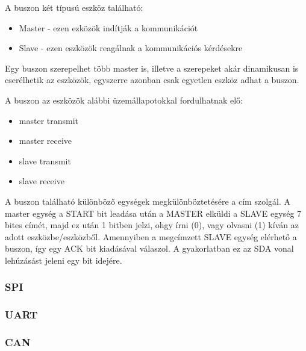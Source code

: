 

A buszon két típusú eszköz található:
\begin{itemize}
    \item Master - ezen ezközök indítják a kommunikációt
    \item Slave - ezen eszközök reagálnak a kommunikációs kérdésekre
\end{itemize}

Egy buszon szerepelhet több master is, illetve a szerepeket akár dinamikusan is cserélhetik az eszközök, egyszerre azonban csak egyetlen eszköz adhat a buszon.

A buszon az eszközök alábbi üzemállapotokkal fordulhatnak elő:
\begin{itemize}
    \item master transmit
    \item master receive
    \item slave transmit
    \item slave receive
\end{itemize}

A buszon található különböző egységek megkülönböztetésére a cím szolgál. A master egység a START bit leadása után a MASTER elküldi a SLAVE egység 7 bites címét, majd ez után 1 bitben jelzi, ohgy írni (0), vagy olvasni (1) kíván az adott eszközbe/eszközből. Amennyiben a megcímzett SLAVE egység elérhető a buszon, így egy ACK bit kiadásával válaszol. A gyakorlatban ez az SDA vonal lehúzásást jeleni egy bit idejére.











\subsubsection{SPI}





\subsubsection{UART}








\subsubsection{CAN}













\vspace{-1.5mm}
\newpage